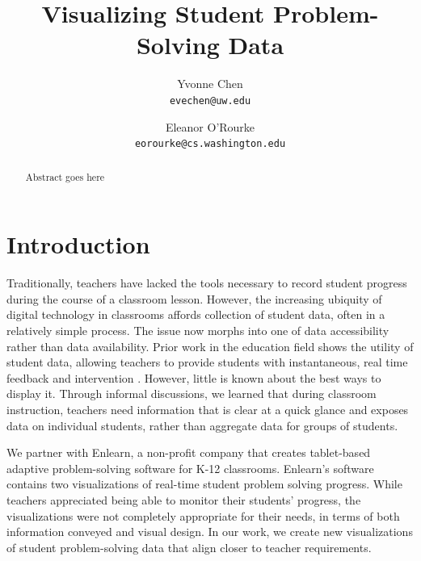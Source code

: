 \documentclass{sigchi}
\begin{document}
\author{
  Yvonne Chen\\
  \texttt{evechen@uw.edu}
  \and
  Eleanor O'Rourke\\
  \texttt{eorourke@cs.washington.edu}
}
\title{Visualizing Student Problem-Solving Data}


\maketitle

\begin{abstract}
Abstract goes here
\end{abstract}




\section{Introduction}
Traditionally, teachers have lacked the tools necessary to record student progress during the course of a classroom lesson. However, the increasing ubiquity of digital technology in classrooms affords collection of student data, often in a relatively simple process. The issue now morphs into one of data accessibility rather than data availability. Prior work in the education field shows the utility of student data, allowing teachers to provide students with instantaneous, real time feedback and intervention \cite{Balaam2010, Koile2006, Lazar2007}. However, little is known about the best ways to display it. Through informal discussions, we learned that during classroom instruction, teachers need information that is clear at a quick glance and exposes data on individual students, rather than aggregate data for groups of students. 

We partner with Enlearn, a non-profit company that creates tablet-based adaptive problem-solving software for K-12 classrooms. Enlearn's software contains two visualizations of real-time student problem solving progress. While teachers appreciated being able to monitor their students' progress, the visualizations were not completely appropriate for their needs, in terms of both information conveyed and visual design. In our work, we create new visualizations of student problem-solving data that align closer to teacher requirements. 
\end{document}

